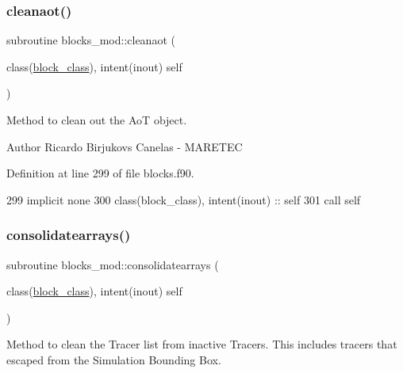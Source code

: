 \subsubsection{\texorpdfstring{cleanaot()}{cleanaot()}}
{\footnotesize\ttfamily subroutine blocks\+\_\+mod\+::cleanaot (\begin{DoxyParamCaption}\item[{class(\mbox{\hyperlink{structblocks__mod_1_1block__class}{block\+\_\+class}}), intent(inout)}]{self }\end{DoxyParamCaption})\hspace{0.3cm}{\ttfamily [private]}}



Method to clean out the AoT object. 

\begin{DoxyAuthor}{Author}
Ricardo Birjukovs Canelas -\/ M\+A\+R\+E\+T\+EC 
\end{DoxyAuthor}


Definition at line 299 of file blocks.\+f90.


\begin{DoxyCode}
299     \textcolor{keywordtype}{implicit none}
300     \textcolor{keywordtype}{class}(block\_class), \textcolor{keywordtype}{intent(inout)} :: self
301     \textcolor{keyword}{call }self%
\end{DoxyCode}
\mbox{\label{namespaceblocks__mod_a25ff530b5125e4cee5b1f474b2491883}} 
\subsubsection{\texorpdfstring{consolidatearrays()}{consolidatearrays()}}
{\footnotesize\ttfamily subroutine blocks\+\_\+mod\+::consolidatearrays (\begin{DoxyParamCaption}\item[{class(\mbox{\hyperlink{structblocks__mod_1_1block__class}{block\+\_\+class}}), intent(inout)}]{self }\end{DoxyParamCaption})\hspace{0.3cm}{\ttfamily [private]}}



Method to clean the Tracer list from inactive Tracers. This includes tracers that escaped from the Simulation Bounding Box. 

